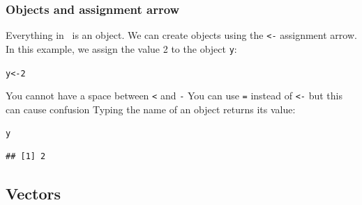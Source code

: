 \documentclass[color=usenames,dvipsnames]{beamer}\usepackage[]{graphicx}\usepackage[]{color}
\makeatletter
\newcommand{\hlnum}[1]{\textcolor[rgb]{0.69,0.494,0}{#1}}%
\newcommand{\hlstd}[1]{\textcolor[rgb]{0,0,0}{#1}}%
\newcommand{\hlkwb}[1]{\textcolor[rgb]{0,0.341,0.682}{#1}}%
\newenvironment{kframe}{%
 \def\at@end@of@kframe{}%
 \ifinner\ifhmode%
  \def\at@end@of@kframe{\end{minipage}}%
  \begin{minipage}{\columnwidth}%
 \fi\fi%
 \def\FrameCommand##1{\hskip\@totalleftmargin \hskip-\fboxsep
 \colorbox{shadecolor}{##1}\hskip-\fboxsep
     \hskip-\linewidth \hskip-\@totalleftmargin \hskip\columnwidth}%
 \MakeFramed {\advance\hsize-\width
   \@totalleftmargin\z@ \linewidth\hsize
   \@setminipage}}%
 {\par\unskip\endMakeFramed%
 \at@end@of@kframe}
\newenvironment{knitrout}{}{} %
\newcommand{\inr}[1]{\colorbox{inlinecolor}{\texttt{#1}}}
\makeatother
\begin{document}
\begin{frame}[fragile]
  \frametitle{Objects and assignment arrow}
      Everything in \R~is an object. We can create objects using the
      \inr{<-} assignment arrow.
      \pause \vfill
      In this example, we assign the value 2 to the object \inr{y}:
\begin{knitrout}
\color{fgcolor}\begin{kframe}
\begin{alltt}
\hlstd{y} \hlkwb{<-} \hlnum{2}
\end{alltt}
\end{kframe}
\end{knitrout}
      \pause \vfill
      You cannot have a space between \inr{<} and \inr{-}
      \pause \vfill
      You can use \inr{=} instead of \inr{<-} but this can cause confusion
      \pause \vfill
      Typing the name of an object returns its value:
\begin{knitrout}
\color{fgcolor}\begin{kframe}
\begin{alltt}
\hlstd{y}
\end{alltt}
\begin{verbatim}
## [1] 2
\end{verbatim}
\end{kframe}
\end{knitrout}
\end{frame}


\subsection{Vectors}
\end{document}
